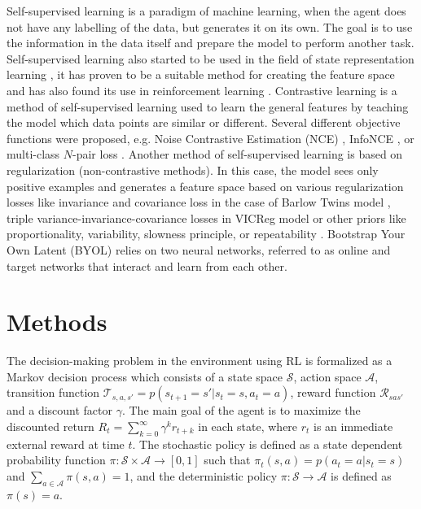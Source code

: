 \documentclass[a4paper,11pt]{elsarticle}
\begin{document}
Self-supervised learning is a paradigm of machine learning, when the agent does not have any labelling of the data, but generates it on its own. The goal is to use the information in the data itself and prepare the model to perform another task. Self-supervised learning also started to be used in the field of state representation learning \citep{Timoth2018}, it has proven to be a suitable method for creating the feature space \citep{Anand2019} and has also found its use in reinforcement learning \citep{Srinivas2020, guo2022byol}. Contrastive learning \citep{Chopra2005} is a method of self-supervised learning used to learn the general features by teaching the model which data points are similar or different. Several different objective functions were proposed, e.g. Noise Contrastive Estimation (NCE) \citep{Gutmann2010}, InfoNCE \citep{Oord2018}, or multi-class $N$-pair loss \citep{Sohn2016}. Another method of self-supervised learning is based on regularization (non-contrastive methods). In this case, the model sees only positive examples and generates a feature space based on various regularization losses like invariance and covariance loss in the case of Barlow Twins model \citep{Zbontar2021}, triple variance-invariance-covariance losses in VICReg model \citep{Bardes2022} or other priors like proportionality, variability, slowness principle, or repeatability \citep{jonschkowski2015learning}. 
Bootstrap Your Own Latent (BYOL) \citep{grill2020bootstrap} relies on two neural networks, referred to as online and target networks that interact and learn from each other.

\section{Methods}
\label{sec:methods}

The decision-making problem in the environment using RL is formalized as a Markov decision process which consists of a state space $\mathcal{S}$, action space $\mathcal{A}$, transition function $\mathcal{T}_{s,a,s'} = p(s_{t+1} = s'|s_t = s, a_{t} = a)$, reward function $\mathcal{R}_{sas'}$ and a discount factor $\gamma$. The main goal of the agent is to maximize the discounted return  
$R_t = \sum_{k=0}^\infty \gamma^k r_{t+k}$
in each state, where $r_t$ is an immediate external reward at time $t$.
The stochastic policy is defined as a state dependent probability function $\pi : \mathcal{S} \times \mathcal{A} \rightarrow [0, 1]$ such that
$\pi_{t}(s,a) = p(a_t = a | s_t = s)$ and $\sum_{a \in \mathcal{A}} \pi(s,a) = 1$,
and the deterministic policy $\pi: \mathcal{S}\rightarrow \mathcal{A}$ is defined as $\pi(s) = a$.
\end{document}
